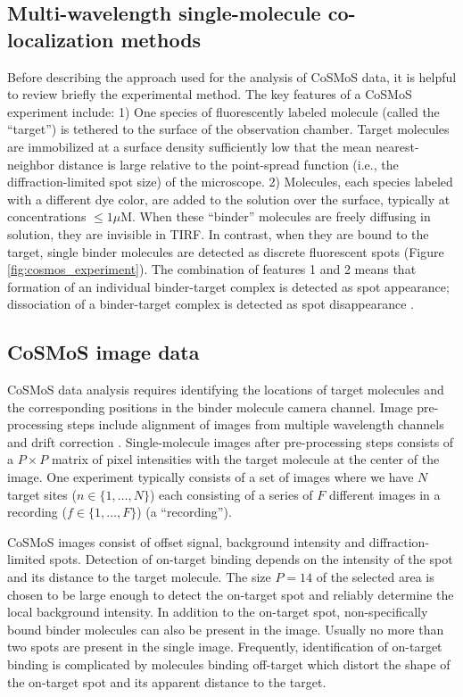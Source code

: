 \subsection{Multi-wavelength single-molecule co-localization methods}

Before describing the approach used for the analysis of CoSMoS data, it is helpful to  review briefly the experimental method. The key features of a CoSMoS experiment include: 1) One species of fluorescently labeled molecule (called the “target”) is tethered to the surface of the observation chamber. Target molecules are immobilized at a surface density sufficiently low that the mean nearest-neighbor distance is large relative to the point-spread function (i.e., the diffraction-limited spot size) of the microscope. 2) Molecules, each species labeled with a different dye color, are added to the solution over the surface, typically at concentrations $\leq 1 \mu$M. When these “binder” molecules are freely diffusing in solution, they are invisible in TIRF. In contrast, when they are bound to the target, single binder molecules are detected as discrete fluorescent spots (Figure \ref{fig:cosmos_experiment}). The combination of features 1 and 2 means that formation of an individual binder-target complex is detected as spot appearance; dissociation of a binder-target complex is detected as spot disappearance \cite{Friedman2006-kb, Friedman2015-nx}.

\subsection{CoSMoS image data}

CoSMoS data analysis requires identifying the locations of target molecules and the corresponding positions in the binder molecule camera channel. Image pre-processing steps include alignment of images from multiple wavelength channels and drift correction \cite{Friedman2015-nx, Smith2019-yb}. Single-molecule images after pre-processing steps consists of a $P \times P$ matrix of pixel intensities with the target molecule at the center of the image. One experiment typically consists of a set of images where we have $N$ target sites ($n \in \{1,\dots,N\}$) each consisting of a series of $F$ different images in a recording ($f \in \{1,\dots,F\}$) (a “recording”).

CoSMoS images consist of offset signal, background intensity and diffraction-limited spots. Detection of on-target binding depends on the intensity of the spot and its distance to the target molecule. The size $P=14$ of the selected area is chosen to be large enough to detect the on-target spot and reliably determine the local background intensity. In addition to the on-target spot, non-specifically bound binder molecules can also be present in the image. Usually no more than two spots are present in the single image. Frequently, identification of on-target binding is complicated by molecules binding off-target which distort the shape of the on-target spot and its apparent distance to the target. 

